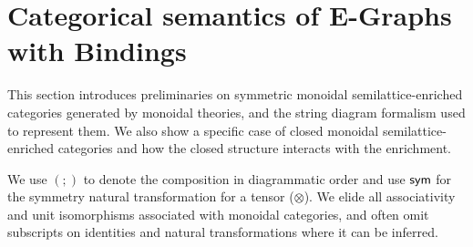 \section{Categorical semantics of E-Graphs with Bindings}%
\label{sec:categorical}

This section introduces preliminaries on symmetric monoidal semilattice-enriched categories generated by monoidal theories, and the string diagram formalism used to represent them.
We also show a specific case of closed monoidal semilattice-enriched categories and how the closed structure interacts with the enrichment.

We use $(;\!)$ to denote the composition in diagrammatic order and use $\textsf{sym}$ for the symmetry natural transformation for a tensor ($\otimes$).
We elide all associativity and unit isomorphisms associated with monoidal categories, and often omit subscripts on identities and natural transformations where it can be inferred.

